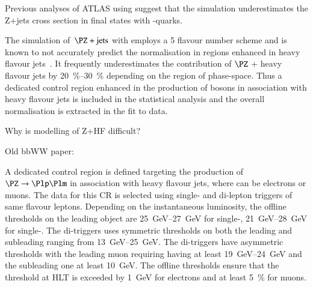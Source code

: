 









Previous analyses of ATLAS using  suggest that the
simulation underestimates the Z+jets cross section in final states
with \Pbottom-quarks.

The simulation of~$\PZ+\text{jets}$ with  employs a 5
flavour number scheme and is known to not accurately predict the
normalisation in regions enhanced in heavy flavour
jets~\cite{HIGG-2016-29,STDM-2017-38}. It frequently underestimates the
contribution of $\PZ$ + heavy flavour jets by
\SIrange{20}{30}{\percent} depending on the region of
phase-space. Thus a dedicated control region enhanced in the
production of \PZ bosons in association with heavy flavour jets is
included in the statistical analysis and the overall normalisation is
extracted in the fit to data.

Why is modelling of Z+HF difficult?

Old bbWW paper: \cite{HDBS-2018-33}

A dedicated control region is defined targeting the production of
$\PZ \ra \Plp\Plm$ in association with heavy flavour jets, where \Pl
can be electrons or muons. The data for this CR is selected using
single- and di-lepton triggers of same flavour leptons. Depending on
the instantaneous luminosity, the offline thresholds on the leading
object \pT are \SIrange{25}{27}{\GeV} for single-\Pe,
\SIrange{21}{28}{\GeV} for single-\Pmu. The di-\Pe triggers uses
symmetric \pT thresholds on both the leading and subleading ranging
from \SIrange{13}{25}{\GeV}. The di-\Pmu triggers have asymmetric
thresholds with the leading muon requiring having at least
\SIrange{19}{24}{\GeV} \pT and the subleading one at least
\SI{10}{\GeV}. The offline \pT thresholds ensure that the threshold at
HLT is exceeded by \SI{1}{\GeV} for electrons and at least
\SI{5}{\percent} for muons.

